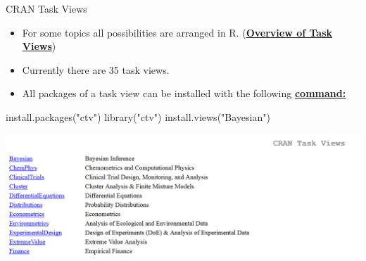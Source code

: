 \documentclass[
  10pt,
  ignorenonframetext,
]{beamer}
\newenvironment{Shaded}{\begin{snugshade}}{\end{snugshade}}
\newcommand{\KeywordTok}[1]{\textcolor[rgb]{0.94,0.87,0.69}{#1}}
\newcommand{\NormalTok}[1]{\textcolor[rgb]{0.80,0.80,0.80}{#1}}
\newcommand{\StringTok}[1]{\textcolor[rgb]{0.80,0.58,0.58}{#1}}
\providecommand{\tightlist}{%
  \setlength{\itemsep}{0pt}\setlength{\parskip}{0pt}}
\begin{document}
\begin{frame}[fragile]{CRAN Task Views}
\protect\hypertarget{cran-task-views}{}

\begin{itemize}
\tightlist
\item
  For some topics all possibilities are arranged in R.
  (\href{https://cran.r-project.org/web/views/}{\textbf{Overview of Task
  Views}})
\item
  Currently there are 35 task views.
\item
  All packages of a task view can be installed with the following
  \href{https://mran.microsoft.com/rpackages/}{\textbf{command:}}
\end{itemize}

\begin{Shaded}
\begin{Highlighting}[]
\KeywordTok{install.packages}\NormalTok{(}\StringTok{"ctv"}\NormalTok{)}
\KeywordTok{library}\NormalTok{(}\StringTok{"ctv"}\NormalTok{)}
\KeywordTok{install.views}\NormalTok{(}\StringTok{"Bayesian"}\NormalTok{)}
\end{Highlighting}
\end{Shaded}

\includegraphics{figure/CRANtaskViews.PNG}

\end{frame}
\end{document}
